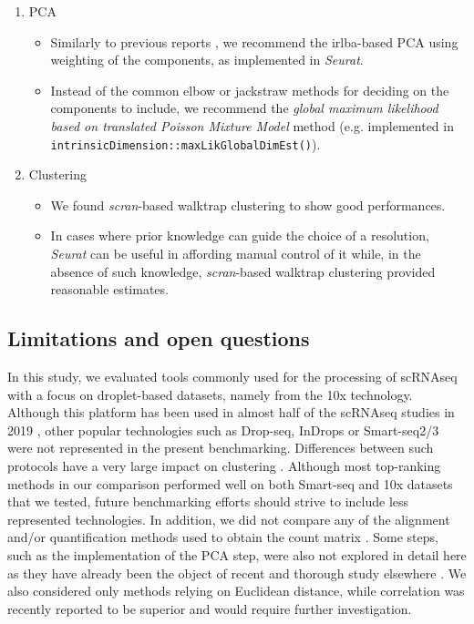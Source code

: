 \documentclass{bmcart}
\begin{document}
\begin{enumerate}
\begin{itemize}
   \end{itemize}
   \item PCA
   \begin{itemize}
     \item Similarly to previous reports \citep{SunDimRed2019}, we recommend the irlba-based PCA using weighting of the components, as implemented in \textit{Seurat}. 
     \item Instead of the common elbow or jackstraw methods for deciding on the components to include, we recommend the \textit{global maximum likelihood based on translated Poisson Mixture Model} method (e.g. implemented in \texttt{intrinsicDimension::maxLikGlobalDimEst()}).
   \end{itemize}
   \item Clustering
   \begin{itemize}
    \item We found \textit{scran}-based walktrap clustering to show good performances.
    \item In cases where prior knowledge can guide the choice of a resolution, \textit{Seurat} can be useful in affording manual control of it while, in the absence of such knowledge, \textit{scran}-based walktrap clustering provided reasonable estimates.
   \end{itemize}
\end{enumerate}



\subsection*{Limitations and open questions}

In this study, we evaluated tools commonly used for the processing of scRNAseq with a focus on droplet-based datasets, namely from the 10x technology. Although this platform has been used in almost half of the scRNAseq studies in 2019 \citep{SvenssonDB2019}, other popular technologies such as Drop-seq, InDrops or Smart-seq2/3 were not represented in the present benchmarking. Differences between such protocols have a very large impact on clustering \citep{MereuCellAtlas2019}. Although most top-ranking methods in our comparison performed well on both Smart-seq and 10x datasets that we tested, future benchmarking efforts should strive to include less represented technologies. In addition, we did not compare any of the alignment and/or quantification methods used to obtain the count matrix \citep{MereuCellAtlas2019}. Some steps, such as the implementation of the PCA step, were also not explored in detail here as they have already been the object of recent and thorough study elsewhere \citep{SunDimRed2019}. We also considered only methods relying on Euclidean distance, while correlation was recently reported to be superior\citep{kim_impact_2019} and would require further investigation.
\end{document}
